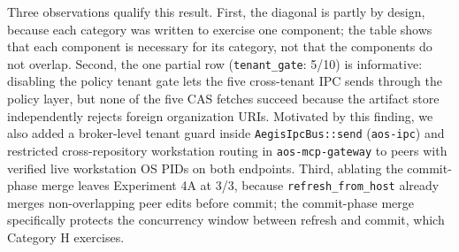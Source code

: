 \documentclass[10pt,twocolumn]{article}
\begin{document}
Three observations qualify this result. First, the diagonal is partly by design, because each category was written to exercise one component; the table shows that each component is necessary for its category, not that the components do not overlap. Second, the one partial row (\texttt{tenant\_gate}: 5/10) is informative: disabling the policy tenant gate lets the five cross-tenant IPC sends through the policy layer, but none of the five CAS fetches succeed because the artifact store independently rejects foreign organization URIs. Motivated by this finding, we also added a broker-level tenant guard inside \texttt{AegisIpcBus::send} (\texttt{aos-ipc}) and restricted cross-repository workstation routing in \texttt{aos-mcp-gateway} to peers with verified live workstation OS PIDs on both endpoints. Third, ablating the commit-phase merge leaves Experiment 4A at 3/3, because \texttt{refresh\_from\_host} already merges non-overlapping peer edits before commit; the commit-phase merge specifically protects the concurrency window between refresh and commit, which Category H exercises.

\begin{table}[!t]
\centering
\caption{\textbf{Experiment 6 (RQ6): Component Ablation.} Attacks (out of 10 per category) that compromise Aegis OS when a single component is switched off in a test-only build (\texttt{scripts/e5\_ablation.py}); identical on macOS and Linux. The first row is the full system.}
\label{tab:ablation}
\vspace{2pt}
\end{table}
\end{document}
